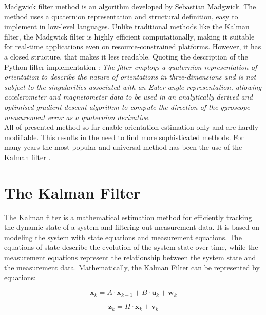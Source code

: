 Madgwick filter method is an algorithm developed by Sebastian Madgwick. The method uses a quaternion representation and structural definition, easy to implement in low-level languages. Unlike traditional methods like the Kalman filter, the Madgwick filter is highly efficient computationally, making it suitable for real-time applications even on resource-constrained platforms. However, it has a closed structure, that makes it less readable. Quoting the description of the Python filter implementation \cite{madgwick2}: \textit{The filter employs a quaternion representation of orientation to describe the nature of orientations in three-dimensions and is not subject to the singularities associated with an Euler angle representation, allowing accelerometer and magnetometer data to be used in an analytically derived and optimised gradient-descent algorithm to compute the direction of the gyroscope measurement error as a quaternion derivative.}\\

All of presented method so far enable orientation estimation only and are hardly modifiable. This results in the need to find more sophisticated methods. For many years the most popular and universal method has been the use of the Kalman filter \cite{ekf_poor}.

\section{The Kalman Filter}


The Kalman filter is a mathematical estimation method for efficiently tracking the dynamic state of a system and filtering out measurement data. It is based on modeling the system with state equations and measurement equations. The equations of state describe the evolution of the system state over time, while the measurement equations represent the relationship between the system state and the measurement data. Mathematically, the Kalman Filter can be represented by equations:

\begin{equation}
	\bm{x}_k = A \cdot \bm{x}_{k-1} + B \cdot \bm{u}_k + \bm{w}_k
	\label{kf1}
\end{equation}

\begin{equation}
	\bm{z}_k = H \cdot \bm{x}_k + \bm{v}_k
	\label{kf2}
\end{equation}


